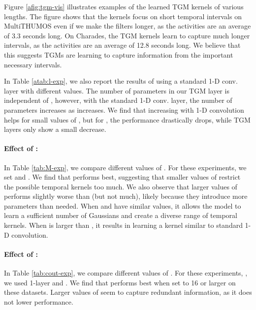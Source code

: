 \documentclass{article}
\begin{document}
Figure \ref{afig:tgm-vis} illustrates examples of the learned TGM kernels of various lengths. The figure shows that the kernels focus on short temporal intervals on MultiTHUMOS even if we make the filters longer, as the activities are an average of 3.3 seconds long. On Charades, the TGM kernels learn to capture much longer intervals, as the activities are an average of 12.8 seconds long. We believe that this suggests TGMs are learning to capture information from the important necessary intervals.

In Table \ref{atab:l-exp}, we also report the results of using a standard 1-D conv. layer with different  values. The number of parameters in our TGM layer is independent of , however, with the standard 1-D conv. layer, the number of parameters increases as  increases. We find that increasing  with 1-D convolution helps for small values of , but for , the performance drastically drops, while TGM layers only show a small decrease.




\paragraph{Effect of :} In Table \ref{tab:M-exp}, we compare different values of . For these experiments, we set  and . We find that  performs best, suggesting that smaller values of  restrict the possible temporal kernels too much. We also observe that larger values of  performs slightly worse than  (but not much), likely because they introduce more parameters than needed. When  and  have similar values, it allows the model to learn a sufficient number of Gaussians and create a diverse range of temporal kernels. When  is larger than , it results in learning a kernel similar to standard 1-D convolution.


\paragraph{Effect of :} In Table \ref{tab:cout-exp}, we compare different values of . For these experiments, , we used 1-layer and . We find that  performs best when set to 16 or larger on these datasets. Larger values of  seem to capture redundant information, as it does not lower performance.
\end{document}
